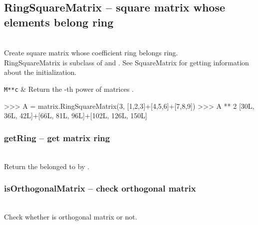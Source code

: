 \subsection{RingSquareMatrix -- square matrix whose elements belong ring}
  \\
  \spacing
  \quad Create square matrix whose coefficient ring belongs ring.\\
  \spacing
  \quad RingSquareMatrix is subclass of  and .
  See SquareMatrix for getting information about the initialization.\\
  \spacing
  \begin{op}
    \verb|M**c| & Return the -th power of matrices .\\
  \end{op}
\begin{ex}
>>> A = matrix.RingSquareMatrix(3, [1,2,3]+[4,5,6]+[7,8,9])
>>> A ** 2
[30L, 36L, 42L]+[66L, 81L, 96L]+[102L, 126L, 150L]
\end{ex}%
\method
  \subsubsection{getRing -- get matrix ring}
   \\
   \spacing
   \quad Return the  belonged to by .\\
   \spacing
  \subsubsection{isOrthogonalMatrix -- check orthogonal matrix}
   \\
   \spacing
   \quad Check whether  is orthogonal matrix or not.\\
   \spacing
